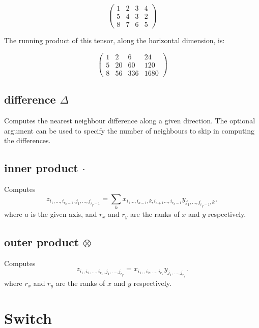 \begin{displaymath}
  \left(
  \begin{array}{cccc}
    1& 2& 3& 4\\ 
    5& 4& 3& 2\\ 
    8& 7& 6& 5 
  \end{array}
  \right)
\end{displaymath}

The running product of this tensor, along the horizontal dimension, is: 

\begin{displaymath}
  \left(
  \begin{array}{cccc}
    1& 2& 6& 24\\ 
    5& 20& 60& 120\\ 
    8& 56& 336& 1680 
  \end{array}
  \right)
\end{displaymath}

\subsection{difference $\Delta$}\label{Operation:difference}
Computes the nearest neighbour difference along a given direction. The
optional argument can be used to specify the number of neighbours to
skip in computing the differences.

\subsection{inner product $\cdot$}\label{Operation:innerProduct}
Computes
\begin{displaymath}
z_{i_1,\ldots,i_{r_x-1},j_1,\ldots,j_{r_y-1}} =
\sum_k x_{i_1\ldots,i_{a-1},k,i_{a+1}\ldots,i_{r_x-1}}
y_{j_1,\ldots,j_{r_y-1},k},
\end{displaymath}
where $a$ is the given axis, and $r_x$ and $r_y$ are the ranks of $x$ and $y$ respectively.


\subsection{outer product $\otimes$}\label{Operation:outerProduct}
Computes 
\begin{displaymath}
z_{i_1,i_2,\ldots,i_{r_x},j_1,\ldots,j_{r_y}} =
x_{i_1,,i_2,\ldots,i_{r_x}}y_{j_1,\ldots,j_{r_y}}.
\end{displaymath}
where $r_x$ and $r_y$ are the ranks of $x$ and $y$ respectively.


\section{Switch}\label{SwitchIcon}

